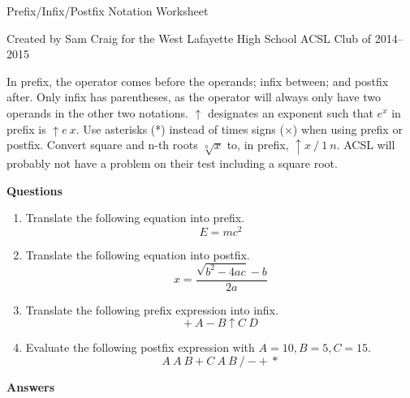 \documentclass[12pt,letterpaper,fleqn]{article}
\begin{document}
\begin{center}
  Prefix/Infix/Postfix Notation Worksheet

  Created by Sam Craig for the West Lafayette High School ACSL Club of 2014--2015
\end{center}

In prefix, the operator comes before the operands; infix between; and postfix after.
Only infix has parentheses, as the operator will always only have two operands in the other two notations.
$\uparrow$ designates an exponent such that $e^x$ in prefix is $\uparrow e\ x$.
Use asterisks (*) instead of times signs ($\times$) when using prefix or postfix.
Convert square and n-th roots $\sqrt[n]{x}$ to, in prefix, $\uparrow x\ /\ 1\ n$.
ACSL will probably not have a problem on their test including a square root.

\bigskip
\noindent \textbf{Questions}

\begin{enumerate}

\item Translate the following equation into prefix.
  \[
  E = mc^2
  \]

\item Translate the following equation into postfix.
  \[
  x = \frac{\sqrt{b^2 - 4ac} - b}{2a}
  \]

\item Translate the following prefix expression into infix.
  \[
  +\ A - B \uparrow C\ D
  \]

\item Evaluate the following postfix expression with $A = 10, B = 5, C = 15$.
  \[
  A\ A\ B + C\ A\ B\ / - +\ *
  \]

\end{enumerate}

\pagebreak
\noindent \textbf{Answers}
\end{document}
